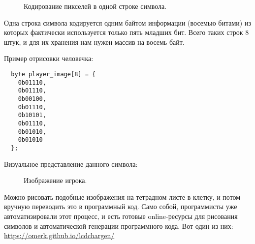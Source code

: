 \documentclass[../sparc.tex]{subfiles}
\begin{document}
\begin{figure}[ht]
  \centering
  \caption{Кодирование пикселей в одной строке символа.}
  \label{fig:game-dev-char-symbol-encoding}
\end{figure}

Одна строка символа кодируется одним байтом информации (восемью битами) из
которых фактически используется только пять младших бит.  Всего таких строк 8
штук, и для их хранения нам нужен массив на восемь байт.

Пример отрисовки человечка:

\begin{verbatim}
  byte player_image[8] = {
    0b01110,
    0b01110,
    0b00100,
    0b01110,
    0b10101,
    0b01110,
    0b01010,
    0b01010
  };
\end{verbatim}

Визуальное представление данного символа:

\begin{figure}[ht]
  \centering
  \caption{Изображение игрока.}
  \label{fig:game-dev-char-symbol-encoding}
\end{figure}

Можно рисовать подобные изображения на тетрадном листе в клетку, и потом вручную
переводить это в программный код.  Само собой, программисты уже автоматизировали
этот процесс, и есть готовые online-ресурсы для рисования символов и
автоматической генерации программного кода.  Вот один из них:
\url{https://omerk.github.io/lcdchargen/}
\end{document}
